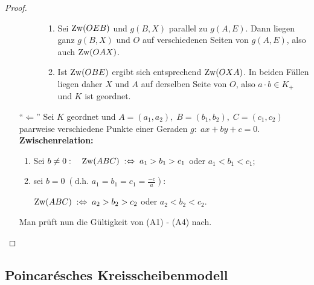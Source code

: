 \begin{proof}
\begin{itemize}
\begin{description}
                    \renewcommand{\labelenumi}{\roman{enumi})} %
                    \begin{enumerate}
                        \item Sei $\operatorname{Zw}(OEB)$ und $g(B,X)$ parallel zu $g(A,E)$. Dann liegen ganz
                            $g(B,X)$ und $O$ auf verschiedenen Seiten von $g(A,E)$, also auch
                            $\operatorname{Zw}(OAX)$.

                        \item Ist $\operatorname{Zw}(OBE)$ ergibt sich entsprechend $\operatorname{Zw}(OXA)$. In beiden Fällen
                            liegen daher $X$ und $A$ auf derselben Seite von $O$, also $a \cdot b
                            \in K_+$ und $K$ ist geordnet.
                    \end{enumerate}
            \end{description}

        \item["`$\Longleftarrow$"'] Sei $K$ geordnet und $A = (a_1,a_2),\; B = (b_1,b_2),\; C =
            (c_1,c_2)$ paarweise verschiedene Punkte einer Geraden $g:\; a x + b y + c = 0$.\\
            \textbf{Zwischenrelation:}

            \renewcommand{\labelenumi}{\arabic{enumi})} %
            \begin{enumerate}
                \item Sei $b \neq 0: \quad \operatorname{Zw}(ABC)\;: \Leftrightarrow\; a_1 > b_1 > c_1$ oder
                    $a_1 < b_1 < c_1$;

                \item sei $b = 0\; (\mbox{d.h. } a_1 = b_1 = c_1 = \frac{-c}{a}):$

                    $\operatorname{Zw}(ABC)\;: \Leftrightarrow\; a_2 > b_2 > c_2$ oder $a_2 < b_2 < c_2$.
            \end{enumerate}

            Man prüft nun die Gültigkeit von (A1) - (A4) nach. %
    \end{itemize}
\end{proof}

\subsection{Poincarésches Kreisscheibenmodell}

